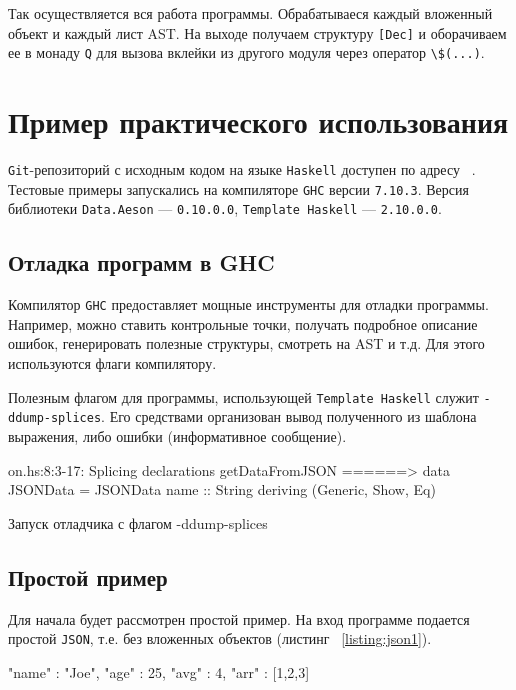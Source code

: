 Так осуществляется вся работа программы. Обрабатываеся каждый вложенный объект и каждый лист AST. На выходе получаем структуру \lstinline{[Dec]} и оборачиваем ее в монаду \lstinline{Q} для вызова вклейки из другого модуля через оператор \lstinline{\$(...)}.

\chapter{Пример практического использования}

\lstinline{Git}-репозиторий с исходным кодом на языке \lstinline{Haskell} доступен по адресу ~\cite{diploma}. Тестовые примеры запускались на компиляторе \lstinline{GHC} версии \lstinline{7.10.3}. Версия библиотеки \lstinline{Data.Aeson} --- \lstinline{0.10.0.0}, \lstinline{Template Haskell} --- \lstinline{2.10.0.0}.

\section{Отладка программ в GHC}

Компилятор \lstinline{GHC} предоставляет мощные инструменты для отладки программы. ~\cite{debugGHC} Например, можно ставить контрольные точки, получать подробное описание ошибок, генерировать полезные структуры, смотреть на AST и т.д. Для этого используются флаги компилятору. 

Полезным флагом для программы, использующей \lstinline{Template Haskell} служит \lstinline{-ddump-splices}. Его средствами организован вывод полученного из шаблона выражения, либо ошибки (информативное сообщение).

\begin{ListingEnv}[H]
\begin{Verb}
on.hs:8:3-17: Splicing declarations
    getDataFromJSON
  ======>
    data JSONData
      = JSONData {name :: String}
      deriving (Generic, Show, Eq)
\end{Verb}
\caption{Запуск отладчика с флагом -ddump-splices}
\end{ListingEnv}

\section{Простой пример}
Для начала будет рассмотрен простой пример. На вход программе подается простой \lstinline{JSON}, т.е. без вложенных объектов (листинг ~\ref{listing:json1}).

\begin{ListingEnv}[H]
\begin{Verb}
{
    "name" : "Joe",
    "age" : 25,
    "avg" : 4,
    "arr" : [1,2,3]
}
\end{Verb}
\label{listing:json1}
\end{ListingEnv}

